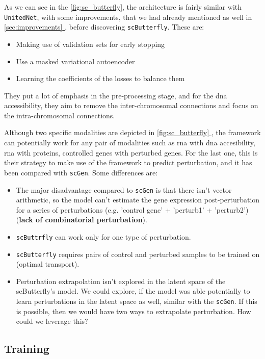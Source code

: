 \documentclass[12pt, a4paper]{article}
\newcommand*{\fullref}[1]{\hyperref[{#1}]{\ref*{#1} \nameref*{#1}}}
\begin{document}
As we can see in the \ref{fig:sc_butterfly}, the architecture is fairly similar with \verb|UnitedNet|, with some improvements, that we had already mentioned as well in \fullref{sec:improvements}, before discovering \verb|scButterfly|. These are:

\begin{itemize}
  \itemsep -0.1em
  \item Making use of validation sets for early stopping
  \item Use a masked variational autoencoder
  \item Learning the coefficients of the losses to balance them
\end{itemize} 

They put a lot of emphasis in the pre-processing stage, and for the dna accessibility, they aim to remove the inter-chromosomal connections and focus on the intra-chromosomal connections.

Although two specific modalities are depicted in \fullref{fig:sc_butterfly}, the framework can potentially work for any pair of modalities such as rna with dna accesibility, rna with proteins, controlled genes with perturbed genes. For the last one, this is their strategy to make use of the framework to predict perturbation, and it has been compared with \verb|scGen|. Some differences are:

\begin{itemize}
  \itemsep -0.1em
  \item The major disadvantage compared to \verb|scGen| is that there isn't vector arithmetic, so the model can't estimate the gene expression post-perturbation for a series of perturbations (e.g. 'control gene' + 'perturb1' + 'perturb2') (\textbf{lack of combinatorial perturbation}).
  \item \verb|scButtrfly| can work only for one type of perturbation.
  \item \verb|scButterfly| requires pairs of control and perturbed samples to be trained on (optimal transport).
  \item Perturbation extrapolation isn't explored in the latent space of the scButterfly's model. We could explore, if the model was able potentially to learn perturbations in the latent space as well, similar with the \verb|scGen|. If this is possible, then we would have two ways to extrapolate perturbation. How could we leverage this?

\end{itemize}

\subsection{Training}
\end{document}
